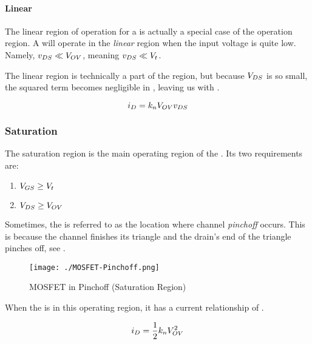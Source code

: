 \paragraph{Linear}\label{par:MOSFET_Linear_Region}
The linear region of operation for a  is actually a special case of the  operation region.
A  will operate in the \emph{linear} region when the input voltage is quite low.
Namely, $v_{DS} \ll V_{OV}$, meaning $v_{DS} \ll V_{t}$.

The linear region is technically a part of the  region, but because $V_{DS}$ is so small, the squared term becomes negligible in , leaving us with .

\begin{equation}\label{eq:MOSFET_Linear_Region-Current}
  i_{D} = k_{n} V_{OV} v_{DS}
\end{equation}

\subsubsection{Saturation}\label{subsubsec:MOSFET_Saturation_Region}
The saturation region is the main operating region of the .
Its two requirements are:
\begin{enumerate}[noitemsep]
\item $V_{GS} \geq V_{t}$
\item $V_{DS} \geq V_{OV}$
\end{enumerate}

Sometimes, the  is referred to as the location where channel \emph{pinchoff} occurs.
This is because the channel finishes its triangle and the drain's end of the triangle pinches off, see .

\begin{figure}[h!tbp]
  \centering
  \texttt{[image: ./MOSFET-Pinchoff.png]}
  \caption{MOSFET in Pinchoff (Saturation Region) \parencite[p.~259]{sedraTextbook7}}
  \label{fig:MOSFET-Pinchoff}
\end{figure}

When the  is in this operating region, it has a current relationship of .

\begin{equation}\label{eq:MOSFET_Saturation_Region-Current}
  i_{D} = \frac{1}{2} k_{n} V_{OV}^{2}
\end{equation}


